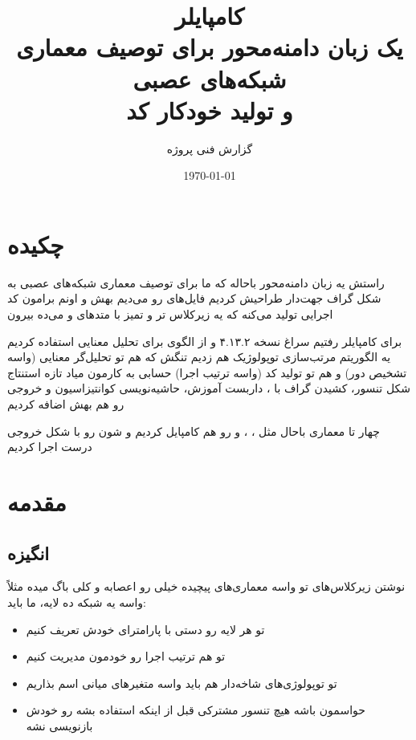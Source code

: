 \documentclass{nngraph-fa}
\title{
    \textbf{کامپایلر \LR{NNGraph DSL}} \\[0.5em]
    \large یک زبان دامنه‌محور برای توصیف معماری شبکه‌های عصبی \\
    و تولید خودکار کد \LR{PyTorch}
}
\author{\large گزارش فنی پروژه}
\date{\today}
\begin{document}
\maketitle
\tableofcontents
\newpage

\chapter*{چکیده}

راستش  یه زبان دامنه‌محور باحاله که ما برای توصیف معماری شبکه‌های عصبی به شکل گراف جهت‌دار طراحیش کردیم
فایل‌های  رو می‌دیم بهش و اونم برامون کد اجرایی  تولید می‌کنه که یه زیرکلاس  تر و تمیز با متدهای  و  می‌ده بیرون

برای کامپایلر رفتیم سراغ  نسخه ۴.۱۳.۲ و از الگوی  برای تحلیل معنایی استفاده کردیم
یه الگوریتم مرتب‌سازی توپولوژیک  هم زدیم تنگش که هم تو تحلیل‌گر معنایی (واسه تشخیص دور) و هم تو تولید کد (واسه ترتیب اجرا) حسابی به کارمون میاد
تازه استنتاج شکل تنسور، کشیدن گراف با ، داربست آموزش، حاشیه‌نویسی کوانتیزاسیون و خروجی  رو هم بهش اضافه کردیم


چهار تا معماری باحال مثل ، ،  و  رو هم کامپایل کردیم و  شون رو با شکل خروجی درست اجرا کردیم

\chapter{مقدمه}

\section{انگیزه}

نوشتن زیرکلاس‌های  تو  واسه معماری‌های پیچیده خیلی رو اعصابه و کلی باگ میده
مثلاً واسه یه شبکه ده لایه، ما باید:

\begin{itemize}
    \item تو  هر لایه رو دستی با پارامترای خودش تعریف کنیم
    \item تو  هم ترتیب اجرا رو خودمون مدیریت کنیم
    \item تو توپولوژی‌های شاخه‌دار هم باید واسه متغیرهای میانی اسم بذاریم
    \item حواسمون باشه هیچ تنسور مشترکی قبل از اینکه استفاده بشه رو خودش بازنویسی نشه
\end{itemize}
\end{document}
